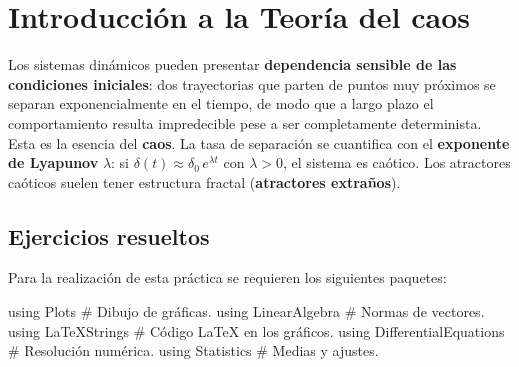 \documentclass[
  spanish,
  a4paper,
]{scrreport}
\newenvironment{Shaded}{\begin{snugshade}}{\end{snugshade}}
\newcommand{\BuiltInTok}[1]{\textcolor[rgb]{0.00,0.23,0.31}{#1}}
\newcommand{\CommentTok}[1]{\textcolor[rgb]{0.37,0.37,0.37}{#1}}
\newcommand{\ImportTok}[1]{\textcolor[rgb]{0.00,0.46,0.62}{#1}}
\theoremstyle{definition}
\theoremstyle{remark}
\begin{document}

\chapter{Introducción a la Teoría del
caos}\label{introducciuxf3n-a-la-teoruxeda-del-caos}

Los sistemas dinámicos pueden presentar \textbf{dependencia sensible de
las condiciones iniciales}: dos trayectorias que parten de puntos muy
próximos se separan exponencialmente en el tiempo, de modo que a largo
plazo el comportamiento resulta impredecible pese a ser completamente
determinista. Esta es la esencia del \textbf{caos}. La tasa de
separación se cuantifica con el \textbf{exponente de Lyapunov}
\(\lambda\): si \(\delta(t)\approx \delta_0\,e^{\lambda t}\) con
\(\lambda > 0\), el sistema es caótico. Los atractores caóticos suelen
tener estructura fractal (\textbf{atractores extraños}).

\section{Ejercicios resueltos}\label{ejercicios-resueltos-9}

Para la realización de esta práctica se requieren los siguientes
paquetes:

\begin{Shaded}
\begin{Highlighting}[]
\ImportTok{using} \BuiltInTok{Plots}                  \CommentTok{\# Dibujo de gráficas.}
\ImportTok{using} \BuiltInTok{LinearAlgebra}          \CommentTok{\# Normas de vectores.}
\ImportTok{using} \BuiltInTok{LaTeXStrings}           \CommentTok{\# Código LaTeX en los gráficos.}
\ImportTok{using} \BuiltInTok{DifferentialEquations}  \CommentTok{\# Resolución numérica.}
\ImportTok{using} \BuiltInTok{Statistics}             \CommentTok{\# Medias y ajustes.}
\end{Highlighting}
\end{Shaded}
\end{document}
